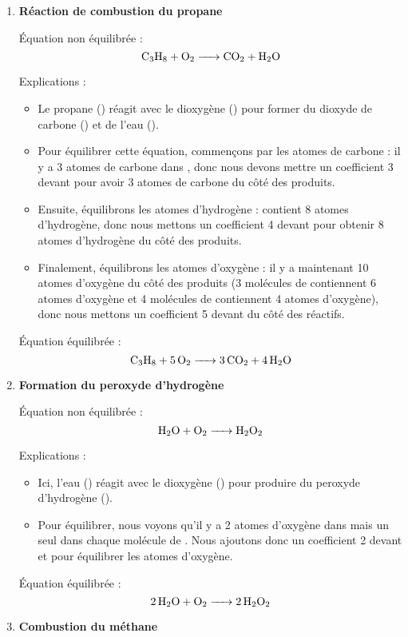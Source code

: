 \documentclass[a4paper,12pt]{article}
\begin{document}
\begin{enumerate}
  \item \textbf{Réaction de combustion du propane}

  Équation non équilibrée :
  \[
  \ce{C3H8 + O2 -> CO2 + H2O}
  \]

  Explications :
  \begin{itemize}
      \item Le propane () réagit avec le dioxygène () pour former du dioxyde de carbone () et de l'eau ().
      \item Pour équilibrer cette équation, commençons par les atomes de carbone : il y a 3 atomes de carbone dans , donc nous devons mettre un coefficient 3 devant  pour avoir 3 atomes de carbone du côté des produits.
      \item Ensuite, équilibrons les atomes d'hydrogène :  contient 8 atomes d'hydrogène, donc nous mettons un coefficient 4 devant  pour obtenir 8 atomes d'hydrogène du côté des produits.
      \item Finalement, équilibrons les atomes d'oxygène : il y a maintenant 10 atomes d'oxygène du côté des produits (3 molécules de  contiennent 6 atomes d'oxygène et 4 molécules de  contiennent 4 atomes d'oxygène), donc nous mettons un coefficient 5 devant  du côté des réactifs.
  \end{itemize}
  Équation équilibrée :
  \[
  \ce{C3H8 + 5 O2 -> 3 CO2 + 4 H2O}
  \]

  \item \textbf{Formation du peroxyde d'hydrogène}

  Équation non équilibrée :
  \[
  \ce{H2O + O2 -> H2O2}
  \]

  Explications :
  \begin{itemize}
      \item Ici, l'eau () réagit avec le dioxygène () pour produire du peroxyde d'hydrogène ().
      \item Pour équilibrer, nous voyons qu'il y a 2 atomes d'oxygène dans  mais un seul dans chaque molécule de . Nous ajoutons donc un coefficient 2 devant  et  pour équilibrer les atomes d'oxygène.
  \end{itemize}
  Équation équilibrée :
  \[
  \ce{2 H2O + O2 -> 2 H2O2}
  \]

  \item \textbf{Combustion du méthane}


\end{enumerate}
\end{document}
